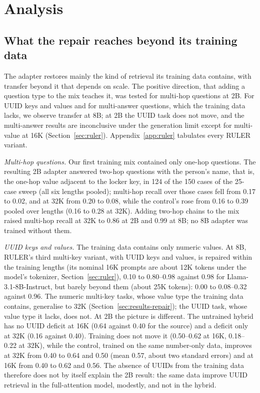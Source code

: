 \documentclass[11pt]{article}
\begin{document}
\section{Analysis}
\label{sec:analysis}

\subsection{What the repair reaches beyond its training data}
\label{sec:coverage}
The adapter restores mainly the kind of retrieval its training data contains, with transfer beyond it that depends on scale. The positive direction, that adding a question type to the mix teaches it, was tested for multi-hop questions at 2B. For UUID keys and values and for multi-answer questions, which the training data lacks, we observe transfer at 8B; at 2B the UUID task does not move, and the multi-answer results are inconclusive under the generation limit except for multi-value at 16K (Section~\ref{sec:ruler}). Appendix~\ref{app:ruler} tabulates every RULER variant.

\emph{Multi-hop questions.} Our first training mix contained only one-hop questions. The resulting 2B adapter answered two-hop questions with the person's name, that is, the one-hop value adjacent to the locker key, in 124 of the 150 cases of the 25-case sweep (all six lengths pooled); multi-hop recall over those cases fell from 0.17 to 0.02, and at 32K from 0.20 to 0.08, while the control's rose from 0.16 to 0.39 pooled over lengths (0.16 to 0.28 at 32K). Adding two-hop chains to the mix raised multi-hop recall at 32K to 0.86 at 2B and 0.99 at 8B; no 8B adapter was trained without them.

\emph{UUID keys and values.} The training data contains only numeric values. At 8B, RULER's third multi-key variant, with UUID keys and values, is repaired within the training lengths (its nominal 16K prompts are about 12K tokens under the model's tokenizer, Section~\ref{sec:ruler}), 0.10 to 0.80--0.98 against 0.98 for Llama-3.1-8B-Instruct, but barely beyond them (about 25K tokens): 0.00 to 0.08--0.32 against 0.96. The numeric multi-key tasks, whose value type the training data contains, generalise to 32K (Section~\ref{sec:results-repair}); the UUID task, whose value type it lacks, does not. At 2B the picture is different. The untrained hybrid has no UUID deficit at 16K (0.64 against 0.40 for the source) and a deficit only at 32K (0.16 against 0.40). Training does not move it (0.50--0.62 at 16K, 0.18--0.22 at 32K), while the control, trained on the same number-only data, improves at 32K from 0.40 to 0.64 and 0.50 (mean 0.57, about two standard errors) and at 16K from 0.40 to 0.62 and 0.56. The absence of UUIDs from the training data therefore does not by itself explain the 2B result: the same data improve UUID retrieval in the full-attention model, modestly, and not in the hybrid.
\end{document}
